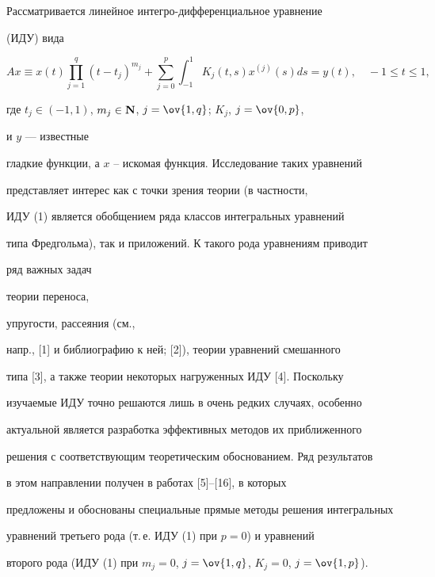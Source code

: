 \label{begin} 


 


 


Рассматривается линейное интегро-дифференциальное уравнение 


(ИДУ) вида 


\begin{equation} 


Ax\equiv x(t)\prod^q_{j=1}(t-t_j)^{m_j}+ 


\sum^p_{j=0}\int^1_{-1}K_j(t,s)x^{(j)}(s)ds=y(t),\quad 


-1\le t\le 1, 


\end{equation} 


где $t_j\in(-1,1)$, $m_j\in\bold N$, $j=\ov{1,q}$; $K_j$, $j=\ov{0,p}$, 


и $y$ --- известные 


гладкие функции, а $x$ -- искомая функция. Исследование таких уравнений 


представляет интерес как с точки зрения теории (в частности, 


ИДУ (1) является обобщением ряда классов интегральных уравнений 


типа Фредгольма), так и приложений. К такого рода уравнениям приводит 


ряд важных задач


теории переноса, 


упругости, рассеяния (см., 


напр., [1] и библиографию к ней; [2]), теории уравнений смешанного 


типа [3], а также теории некоторых нагруженных ИДУ [4]. Поскольку 


изучаемые ИДУ точно решаются лишь в очень редких случаях, особенно 


актуальной является разработка эффективных методов их приближенного 


решения с соответствующим теоретическим обоснованием. Ряд результатов 


в этом направлении получен в работах [5]--[16], в которых 


предложены и обоснованы специальные прямые методы решения интегральных 


уравнений третьего рода (т.\,е. ИДУ (1) при $p=0$) и уравнений 


второго рода (ИДУ (1) при $m_j=0$, $j=\ov{1,q}$, $K_j=0$, $j=\ov{1,p}$). 


